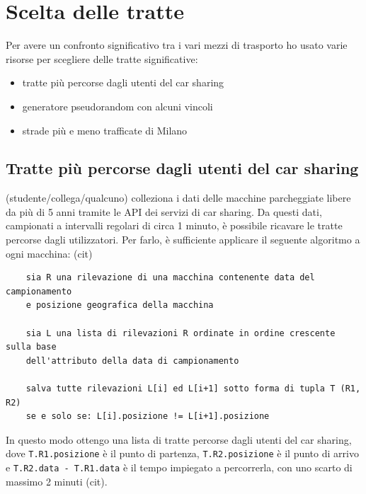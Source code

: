 \documentclass[a4paper]{report}
\begin{document}
	\section{Scelta delle tratte}
	{\large
		Per avere un confronto significativo tra i vari mezzi di trasporto ho usato varie risorse per scegliere delle tratte significative:
		\begin{itemize}
			\item tratte più percorse dagli utenti del car sharing
			\item generatore pseudorandom con alcuni vincoli
			\item strade più e meno trafficate di Milano
		\end{itemize}
	}

	\subsection{Tratte più percorse dagli utenti del car sharing}
	(studente/collega/qualcuno) colleziona i dati delle macchine parcheggiate libere da più di 5 anni tramite le API dei servizi di car sharing. Da questi dati, campionati a intervalli regolari di circa 1 minuto, è possibile ricavare le tratte percorse dagli utilizzatori. Per farlo, è sufficiente applicare il seguente algoritmo a ogni macchina: (cit)
	\begin{verbatim}
	sia R una rilevazione di una macchina contenente data del campionamento
	e posizione geografica della macchina
	
	sia L una lista di rilevazioni R ordinate in ordine crescente sulla base
	dell'attributo della data di campionamento
	
	salva tutte rilevazioni L[i] ed L[i+1] sotto forma di tupla T (R1, R2)
	se e solo se: L[i].posizione != L[i+1].posizione
	\end{verbatim}
	In questo modo ottengo una lista di tratte percorse dagli utenti del car sharing, dove \texttt{T.R1.posizione} è il punto di partenza, \texttt{T.R2.posizione} è il punto di arrivo e \texttt{T.R2.data - T.R1.data} è il tempo impiegato a percorrerla, con uno scarto di massimo 2 minuti (cit).
	
\end{document}
